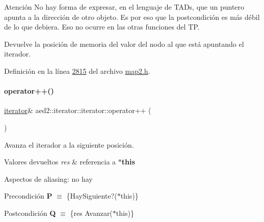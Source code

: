 \begin{DoxyAttention}{Atención}
No hay forma de expresar, en el lenguaje de T\+A\+Ds, que un puntero apunta a la dirección de otro objeto. Es por eso que la postcondición es más débil de lo que debiera. Eso no ocurre en las otras funciones del TP.
\end{DoxyAttention}
Devuelve la posición de memoria del valor del nodo al que está apuntando el iterador. 

Definición en la línea \hyperlink{map2_8h_source_l02815}{2815} del archivo \hyperlink{map2_8h_source}{map2.\+h}.

\mbox{\label{classaed2_1_1iterator_1_1iterator_a457fdf0ed06c88121b441424f1c99f4f_a457fdf0ed06c88121b441424f1c99f4f}} 
\paragraph{\texorpdfstring{operator++()}{operator++()}\hspace{0.1cm}{\footnotesize\ttfamily [1/2]}}
{\footnotesize\ttfamily \hyperlink{classaed2_1_1iterator_1_1iterator}{iterator}\& aed2\+::iterator\+::iterator\+::operator++ (\begin{DoxyParamCaption}{ }\end{DoxyParamCaption})\hspace{0.3cm}{\ttfamily [inline]}}



Avanza el iterador a la siguiente posición. 


\begin{DoxyRetVals}{Valores devueltos}
{\em res} & referencia a {\bfseries $\ast$this}\\
\hline
\end{DoxyRetVals}
\begin{DoxyParagraph}{Aspectos de aliasing\+:}
no hay
\end{DoxyParagraph}
\begin{DoxyPrecond}{Precondición}
{\bfseries P} $\equiv$ \{Hay\+Siguiente?($\ast$this)\} 
\end{DoxyPrecond}
\begin{DoxyPostcond}{Postcondición}
{\bfseries Q} $\equiv$ \{res  Avanzar($\ast$this)\}
\end{DoxyPostcond}

